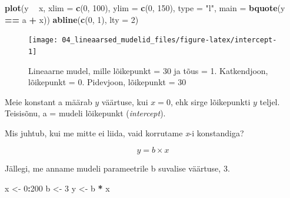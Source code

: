 \documentclass[]{book}
\newenvironment{Shaded}{\begin{snugshade}}{\end{snugshade}}
\newcommand{\KeywordTok}[1]{\textcolor[rgb]{0.13,0.29,0.53}{\textbf{#1}}}
\newcommand{\DataTypeTok}[1]{\textcolor[rgb]{0.13,0.29,0.53}{#1}}
\newcommand{\DecValTok}[1]{\textcolor[rgb]{0.00,0.00,0.81}{#1}}
\newcommand{\StringTok}[1]{\textcolor[rgb]{0.31,0.60,0.02}{#1}}
\newcommand{\OperatorTok}[1]{\textcolor[rgb]{0.81,0.36,0.00}{\textbf{#1}}}
\newcommand{\NormalTok}[1]{#1}
\begin{document}
\begin{Shaded}
\begin{Highlighting}[]
\KeywordTok{plot}\NormalTok{(y }\OperatorTok{~}\StringTok{ }\NormalTok{x, }\DataTypeTok{xlim =} \KeywordTok{c}\NormalTok{(}\DecValTok{0}\NormalTok{, }\DecValTok{100}\NormalTok{), }\DataTypeTok{ylim =} \KeywordTok{c}\NormalTok{(}\DecValTok{0}\NormalTok{, }\DecValTok{150}\NormalTok{), }\DataTypeTok{type =} \StringTok{"l"}\NormalTok{,}
     \DataTypeTok{main =} \KeywordTok{bquote}\NormalTok{(y }\OperatorTok{==}\StringTok{ }\NormalTok{a }\OperatorTok{+}\StringTok{ }\NormalTok{x))}
\KeywordTok{abline}\NormalTok{(}\KeywordTok{c}\NormalTok{(}\DecValTok{0}\NormalTok{, }\DecValTok{1}\NormalTok{), }\DataTypeTok{lty =} \DecValTok{2}\NormalTok{)}
\end{Highlighting}
\end{Shaded}

\begin{figure}

{\centering \texttt{[image: 04\_lineaarsed\_mudelid\_files/figure-latex/intercept-1]} 

}

\caption{Lineaarne mudel, mille lõikepunkt = 30 ja tõus = 1.
Katkendjoon, lõikepunkt = 0. Pidevjoon, lõikepunkt = 30}\label{fig:intercept}
\end{figure}

Meie konstant a määrab \(y\) väärtuse, kui \(x = 0\), ehk sirge
lõikepunkti \(y\) teljel. Teisisõnu, a = mudeli lõikepunkt
(\emph{intercept}).

Mis juhtub, kui me mitte ei liida, vaid korrutame \emph{x}-i
konstandiga?

\[y =  b \times x\]

Jällegi, me anname mudeli parameetrile b suvalise väärtuse, 3.

\begin{Shaded}
\begin{Highlighting}[]
\NormalTok{x <-}\StringTok{ }\DecValTok{0}\OperatorTok{:}\DecValTok{200}
\NormalTok{b <-}\StringTok{ }\DecValTok{3}
\NormalTok{y <-}\StringTok{ }\NormalTok{b }\OperatorTok{*}\StringTok{ }\NormalTok{x}
\end{Highlighting}
\end{Shaded}

\begin{Shaded}
\end{Shaded}
\end{document}
